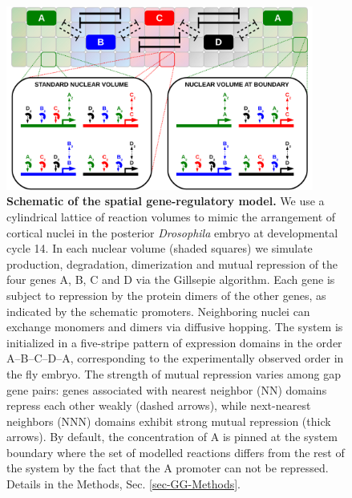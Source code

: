\documentclass[a4paper,10pt]{article}
\newcommand{\Drosophila}{{\it Drosophila}\xspace}
\newcommand{\GA}{A\xspace}
\newcommand{\GB}{B\xspace}
\newcommand{\GC}{C\xspace}
\newcommand{\GD}{D\xspace}
\begin{document}
\begin{figure}[ht!]
  \centering
  \includegraphics[width=0.9\textwidth]{Figures/FigureModel.pdf}
  \caption{\textbf{Schematic of the spatial gene-regulatory model.}
      We use a cylindrical lattice of reaction volumes
      to mimic the arrangement of cortical nuclei in the posterior \Drosophila embryo at developmental cycle 14.
      In each nuclear volume (shaded squares) we simulate production, degradation, dimerization and mutual repression of the four genes \GA, \GB, \GC and \GD via the Gillsepie algorithm.
      Each gene is subject to repression by the protein dimers of the other genes,
      as indicated by the schematic promoters. Neighboring nuclei can exchange monomers and dimers via diffusive hopping. The system is initialized in a five-stripe pattern of expression domains in the order \GA--\GB--\GC--\GD--\GA, corresponding to the experimentally observed order in the fly embryo.
      The strength of mutual repression varies among gap gene pairs: genes associated with nearest neighbor (NN) domains repress each other weakly (dashed arrows), while next-nearest neighbors (NNN) domains exhibit strong mutual repression (thick arrows).
      By default, the concentration of \GA is pinned at the system boundary where
      the set of modelled reactions differs from the rest of the system by the fact that
      the \GA promoter can not be repressed.
      Details in the Methods, Sec. \ref{sec-GG-Methods}.
  \label{Fig-ModelSketch}
  }
\end{figure}
\end{document}

